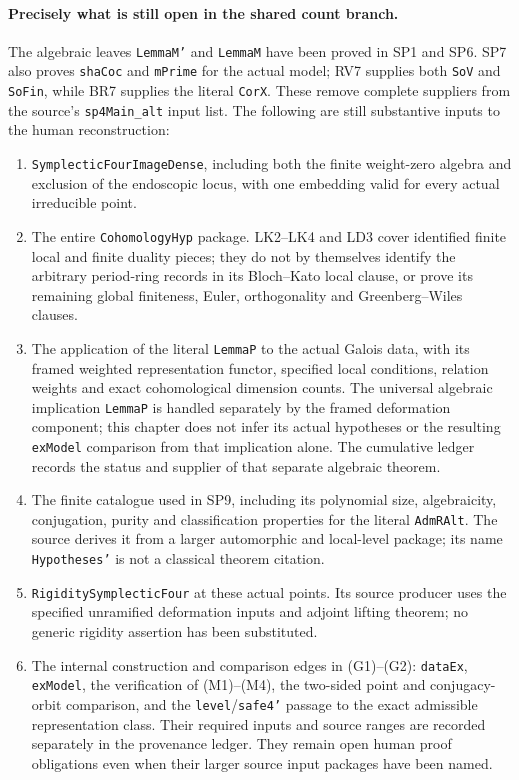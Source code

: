 \paragraph{Precisely what is still open in the shared count branch.}
The algebraic leaves \texttt{LemmaM'} and \texttt{LemmaM} have been
proved in SP1 and SP6.  SP7 also proves \texttt{shaCoc} and
\texttt{mPrime} for the actual model; RV7 supplies both
\texttt{SoV} and \texttt{SoFin}, while BR7 supplies the literal
\texttt{CorX}.  These remove complete suppliers from the source's
\texttt{sp4Main\_alt} input list.  The following are still
substantive inputs to the human reconstruction:
\begin{enumerate}
\item \texttt{SymplecticFourImageDense}, including both the finite
weight-zero algebra and exclusion of the endoscopic locus, with
one embedding valid for every actual irreducible point.
\item The entire \texttt{CohomologyHyp} package.  LK2--LK4 and LD3
cover identified finite local and finite duality pieces; they do
not by themselves identify the arbitrary period-ring records in
its Bloch--Kato local clause, or prove its remaining global
finiteness, Euler, orthogonality and Greenberg--Wiles clauses.
\item The application of the literal \texttt{LemmaP} to the actual
Galois data, with its framed weighted representation functor,
specified local conditions, relation weights and exact
cohomological dimension counts.  The universal algebraic
implication \texttt{LemmaP} is handled separately by the framed
deformation component; this chapter does not infer its actual
hypotheses or the resulting \texttt{exModel} comparison from that
implication alone.  The cumulative ledger records the status and
supplier of that separate algebraic theorem.
\item The finite catalogue used in SP9, including its polynomial
size, algebraicity, conjugation, purity and classification
properties for the literal \texttt{AdmRAlt}.  The source derives
it from a larger automorphic and local-level package; its name
\texttt{Hypotheses'} is not a classical theorem citation.
\item \texttt{RigiditySymplecticFour} at these actual points.  Its
source producer uses the specified unramified deformation inputs
and adjoint lifting theorem; no generic rigidity assertion has
been substituted.
\item The internal construction and comparison edges in (G1)--(G2):
\texttt{dataEx}, \texttt{exModel}, the verification of (M1)--(M4),
the two-sided point and conjugacy-orbit comparison, and the
\texttt{level}/\texttt{safe4'} passage to the exact admissible
representation class.  Their required inputs and source ranges
are recorded separately in the provenance ledger.  They remain
open human proof obligations even when their larger source input
packages have been named.
\end{enumerate}
